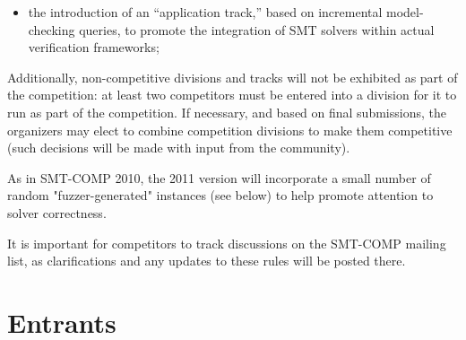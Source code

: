 \documentclass[12pt]{article}
\begin{document}
\begin{itemize}
\item the introduction of an ``application track,'' based on incremental
      model-checking queries, to promote the integration of SMT solvers
      within actual verification frameworks;
\end{itemize}

Additionally, non-competitive divisions and tracks will not be exhibited as
part of the competition: at least two competitors must be entered
into a division for it to run as part of the competition.
If necessary, and based on final submissions, the organizers may elect to
combine competition divisions to make them competitive (such decisions will
be made with input from the community).

As in SMT-COMP 2010, the 2011 version will incorporate a small number of
random "fuzzer-generated" instances (see below) to help promote
attention to solver correctness.

It is important for competitors to track discussions on the SMT-COMP mailing
list, as clarifications and any updates to these rules will be posted there.

\section{Entrants}
\label{sec:entrants}
\end{document}
